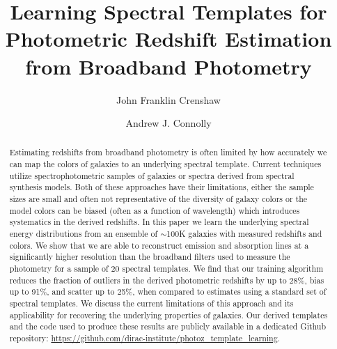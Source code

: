 \documentclass[twocolumn]{aastex63}
\begin{document}
 


\title{Learning Spectral Templates for Photometric Redshift Estimation \\ from Broadband Photometry}


\author[0000-0002-2495-3514]{John Franklin Crenshaw}

\author[0000-0001-5576-8189]{Andrew J. Connolly}


\begin{abstract}
    Estimating redshifts from broadband photometry is often limited by how accurately we can map the colors of galaxies to an underlying spectral template. 
    Current techniques utilize  spectrophotometric samples of galaxies or spectra derived from spectral synthesis models. 
    Both of these approaches have their limitations, either the sample sizes are small and often not representative of the diversity of galaxy colors or the model colors can be biased (often as a function of wavelength) which introduces systematics in the derived redshifts. 
    In this paper we learn the underlying spectral energy distributions from an ensemble of  $\sim$100K galaxies with measured redshifts and colors. 
    We show that we are able to reconstruct emission and absorption lines at a significantly higher resolution than the broadband filters used to measure the photometry for a sample of 20 spectral templates. 
    We find that our training algorithm reduces the fraction of outliers in the derived photometric redshifts by up to 28\%, bias up to 91\%, and scatter up to 25\%, when compared to estimates using a standard set of spectral templates. 
    We discuss the current limitations of this approach and its applicability for recovering the underlying properties of galaxies.
    Our derived templates and the code used to produce these results are publicly available in a dedicated Github repository: \url{https://github.com/dirac-institute/photoz_template_learning}.
    \\
    \medskip
\end{abstract}
\end{document}
